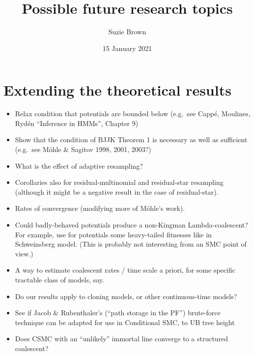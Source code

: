 \documentclass{article}
\title{Possible future research topics}
\author{Suzie Brown}
\date{15 January 2021}
\begin{document}
\maketitle
\thispagestyle{fancy}

\section*{Extending the theoretical results}
\begin{itemize}
\item Relax condition that potentials are bounded below (e.g.\ see Capp\'e, Moulines, Ryd\'en ``Inference in HMMs'', Chapter 9)
\item Show that the condition of BJJK Theorem 1 is necessary as well as sufficient (e.g.\ see M\"ohle \& Sagitov 1998, 2001, 2003?)
\item What is the effect of adaptive resampling?
\item Corollaries also for residual-multinomial and residual-star resampling (although it might be a negative result in the case of residual-star).
\item Rates of convergence (modifying more of M\"ohle's work).
\item Could badly-behaved potentials produce a non-Kingman Lambda-coalescent? For example, use for potentials some heavy-tailed fitnesses like in Schweinsberg model. (This is probably not interesting from an SMC point of view.)
\item A way to estimate coalescent rates / time scale a priori, for some specific tractable class of models, say.
\item Do our results apply to cloning models, or other continuous-time models?
\item See if Jacob \& Rubenthaler's (``path storage in the PF'') brute-force technique can be adapted for use in Conditional SMC, to UB tree height
\item Does CSMC with an ``unlikely'' immortal line converge to a structured coalescent?
\end{itemize}
\end{document}
